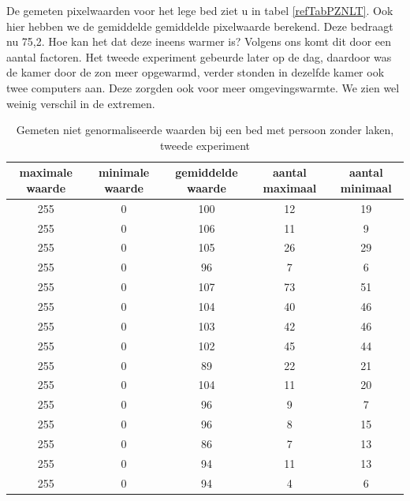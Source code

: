 De gemeten pixelwaarden voor het lege bed ziet u in tabel \ref{refTabPZNLT}. Ook hier hebben we de gemiddelde gemiddelde pixelwaarde berekend. Deze bedraagt nu 75,2. Hoe kan het dat deze ineens warmer is? Volgens ons komt dit door een aantal factoren. Het tweede experiment gebeurde later op de dag, daardoor was de kamer door de zon meer opgewarmd, verder stonden in dezelfde kamer ook twee computers aan. Deze zorgden ook voor meer omgevingswarmte. We zien wel weinig verschil in de extremen. \\
\begin{table}[hbp]
	\caption{Gemeten niet genormaliseerde waarden bij een bed met persoon zonder laken, tweede experiment}
	\begin{tabular}{|c|c|c|c|c|}
		\hline
		maximale waarde & minimale waarde & gemiddelde waarde & aantal maximaal & aantal minimaal \\ \hline
		255 & 0 & 100 & 12 & 19 \\ \hline
		255 & 0 & 106 & 11 & 9  \\ \hline
		255 & 0 & 105 & 26 & 29 \\ \hline
		255 & 0 & 96  & 7  & 6 \\ \hline
		255 & 0 & 107 & 73 & 51  \\ \hline
		255 & 0 & 104 & 40 & 46 \\ \hline
		255 & 0 & 103 & 42 & 46 \\ \hline
		255 & 0 & 102 & 45 & 44 \\ \hline
		255 & 0 & 89  & 22 & 21 \\ \hline
		255 & 0 & 104 & 11 & 20 \\ \hline
		255 & 0 & 96  & 9  & 7 \\ \hline
		255 & 0 & 96  & 8  & 15 \\ \hline
		255 & 0 & 86  & 7  & 13  \\ \hline
		255 & 0 & 94  & 11 & 13 \\ \hline
		255 & 0 & 94  & 4  & 6  \\ \hline
	\end{tabular}
	\label{refTabPZNPT}
\end{table}

